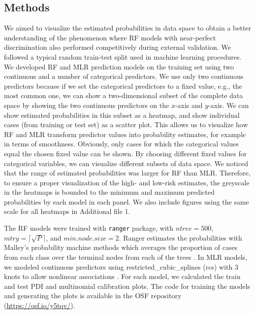 \subsection{Methods}
We aimed to visualize the estimated probabilities in data space to obtain a
better understanding of the phenomenon where \gls{RF} models with near-perfect
discrimination also performed competitively during external validation. We
followed a typical random train-test split used in machine learning procedures.
We developed \gls{RF} and \gls{MLR} prediction models on the training set using two
continuous and a number of categorical predictors. We use only two continuous
predictors because if we set the categorical predictors to a fixed value, e.g.,
the most common one, we can show a two-dimensional subset of the complete data
space by showing the two continuous predictors on the $x$-axis and $y$-axis. We
can show estimated probabilities in this subset as a heatmap, and show
individual cases (from training or test set) as a scatter plot. This allows us
to visualize how \gls{RF} and \gls{MLR} transform predictor values into probability
estimates, for example in terms of smoothness. Obviously, only cases for which
the categorical values equal the chosen fixed value can be shown. By choosing
different fixed values for categorical variables, we can visualize different
subsets of data space. We noticed that the range of estimated probabilities was
larger for \gls{RF} than \gls{MLR}. Therefore, to ensure a proper visualization of the high-
and low-risk estimates, the greyscale in the heatmaps is bounded to the minimum
and maximum predicted probabilities by each model in each panel. We also include
figures using the same scale for all heatmaps in Additional file 1.

The \gls{RF} models were trained with \texttt{ranger} package, with $\textit{ntree} = 500$,
$\textit{mtry} = \lceil\sqrt{P}\rceil$, and $\textit{min.node.size} = 2$.
Ranger estimates the probabilities with Malley's probability machine methods
which averages the proportion of cases from each class over the terminal nodes
from each of the trees
 \cite{malleyProbabilityMachinesConsistent2012,wrightRangerFastImplementation2017}.
In \gls{MLR} models, we modeled continuous predictors using \gls{restricted_cubic_splines}
(rcs) with 3 knots to allow nonlinear associations
 \cite{gauthierCubicSplinesModel2020,harrellRegressionModelingStrategies2015}.
For each model, we calculated the train and test \gls{PDI} and multinomial calibration
plots. The code for training the models and generating the plots is available in
the \gls{OSF} repository (\url{https://osf.io/y5tqv/}).

